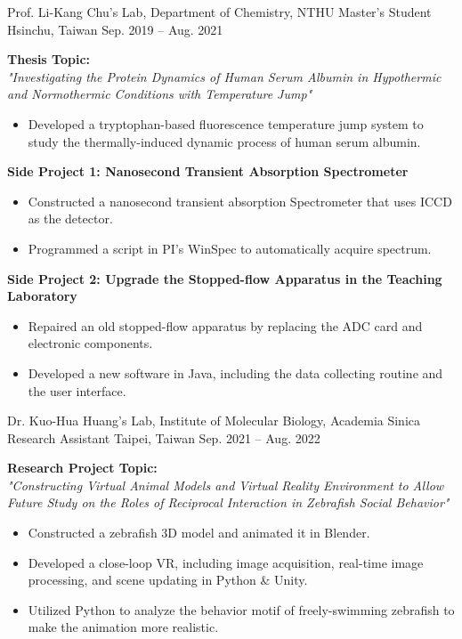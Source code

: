 \begin{cventries}
\cventry
{Prof. Li-Kang Chu's Lab, Department of Chemistry, NTHU}
{Master's Student}
{Hsinchu, Taiwan}
{Sep. 2019 -- Aug. 2021}
{
\begin{minipage}{\textwidth}
\textbf{Thesis Topic:}\\
\textit{"Investigating the Protein Dynamics of Human Serum Albumin in Hypothermic and Normothermic Conditions with Temperature Jump"}
\begin{itemize}
    \item Developed a tryptophan-based fluorescence temperature jump system to study the thermally-induced dynamic process of human serum albumin.
\end{itemize}
\textbf{Side Project 1: Nanosecond Transient Absorption Spectrometer}
\begin{itemize}
    \item Constructed a nanosecond transient absorption Spectrometer that uses ICCD as the detector.
    \item Programmed a script in PI's WinSpec to automatically acquire spectrum.
\end{itemize}
\textbf{Side Project 2: Upgrade the Stopped-flow Apparatus in the Teaching Laboratory}
\begin{itemize}
    \item Repaired an old stopped-flow apparatus by replacing the ADC card and electronic components.
    \item Developed a new software in Java, including the data collecting routine and the user interface.
\end{itemize}
\end{minipage}
}

\cventry
{Dr. Kuo-Hua Huang's Lab, Institute of Molecular Biology, Academia Sinica}
{Research Assistant}
{Taipei, Taiwan}
{Sep. 2021 -- Aug. 2022}
{
\begin{minipage}{\textwidth}
\textbf{Research Project Topic:}\\
\textit{"Constructing Virtual Animal Models and Virtual Reality Environment to Allow Future Study on the Roles of Reciprocal Interaction in Zebrafish Social Behavior"}
\begin{itemize}
    \item Constructed a zebrafish 3D model and animated it in Blender.
    \item Developed a close-loop VR, including image acquisition, real-time image processing, and scene updating in Python \& Unity.
    \item Utilized Python to analyze the behavior motif of freely-swimming zebrafish to make the animation more realistic.
\end{itemize}
\end{minipage}
}
\end{cventries}

